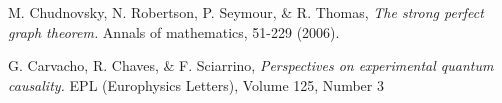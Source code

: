 \documentclass[letterpaper]{article}
\begin{document}
\begin{thebibliography}{}
    M. Chudnovsky, N. Robertson, P. Seymour, \& R. Thomas, 
         {\em The strong perfect graph theorem.} 
         Annals of mathematics, 51-229 (2006).
         
     G. Carvacho, R. Chaves, \& F. Sciarrino, 
        {\em Perspectives on experimental quantum causality.} 
        EPL (Europhysics Letters), Volume 125, Number 3
         









         
         
         
         
         
         
         
\end{thebibliography}

\end{document}

